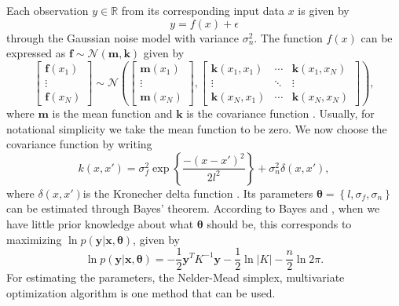 \documentclass[final,authoryear,5p,times,twocolumn]{elsarticle}
\begin{document}
Each observation $y\in \mathbb{R}$ from its corresponding input data $x$ is given by
\[
y=f(x)+ \epsilon
\]
through the Gaussian noise model with variance $\sigma_n^2$. The function $f(x)$ can be expressed as $\mathbf{f}\sim \mathcal{N}(\mathbf{m},\mathbf{k})$ given by
\[
\begin{bmatrix}
\mathbf{f}(x_1)\\ 
\vdots\\ 
\mathbf{f}(x_N)
\end{bmatrix}
\sim \mathcal{N}
\left ( 
\begin{bmatrix}
\mathbf{m}(x_1)\\ 
\vdots\\ 
\mathbf{m}(x_N)
\end{bmatrix},
\begin{bmatrix}
\mathbf{k}(x_1,x_1) & \cdots & \mathbf{k}(x_1,x_N)\\ 
\vdots & \ddots & \vdots\\ 
\mathbf{k}(x_N,x_1) & \cdots & \mathbf{k}(x_N,x_N)
\end{bmatrix} \right ),
\]
where $\mathbf{m}$ is the mean function and $\mathbf{k}$ is the covariance function \citep{GP08}. Usually, for notational simplicity we take the mean function to be zero. We now choose the covariance function by writing
\begin{equation} \label{eq:20}
k(x,{x}')=\sigma_f^2\exp\left \{ \frac{-(x-{x}')^2}{2l^2} \right \}+\sigma_n^2\delta(x,{x}'),
\end{equation} 
where $\delta(x,{x}')$is the Kronecher delta function \citep{Gaussian06}. Its parameters $\mathbf{\theta}=\left \{ l,\sigma_f,\sigma_n \right \}$ can be estimated through Bayes' theorem. According to Bayes and \citet{Gaussian06}, when we have little prior knowledge about what $\mathbf{\theta}$ should be, this corresponds to maximizing $\ln p(\mathbf{y}|\mathbf{x},\mathbf{\theta})$, given by
\begin{equation} \label{eq:21}
\ln p(\mathbf y|\mathbf x,\mathbf \theta)=-\frac{1}{2}\mathbf y^TK^{-1}\mathbf y-\frac{1}{2}\ln\left | K \right |-\frac{n}{2}\ln2\pi.
\end{equation}
For estimating the parameters, the Nelder-Mead simplex, multivariate optimization algorithm \citep{ref20} is one method that can be used.
\end{document}
